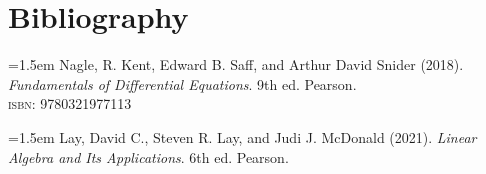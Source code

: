 \documentclass{article}
\begin{document}
\section{Bibliography}
\noindent\hangindent=1.5em 
Nagle, R. Kent, Edward B. Saff, and Arthur David Snider (2018). \textit{Fundamentals of Differential Equations}. 9th ed. Pearson. \\
\hspace*{1.5em}\textsc{isbn}: 9780321977113

\noindent\hangindent=1.5em 
Lay, David C., Steven R. Lay, and Judi J. McDonald (2021). \textit{Linear Algebra and Its Applications}. 6th ed. Pearson.
\end{document}
